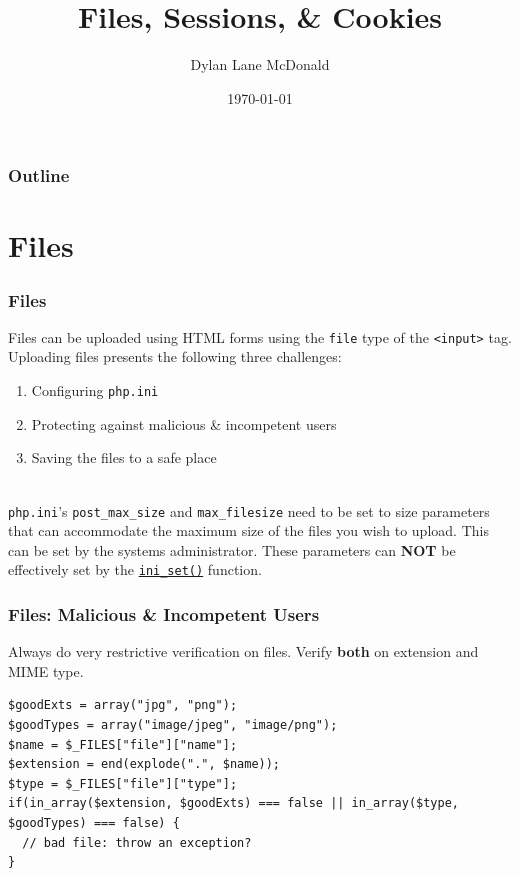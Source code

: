 \documentclass[aspectratio=169]{beamer}
\title{Files, Sessions, \& Cookies}
\author{Dylan Lane McDonald}
\institute{CNM STEMulus Center\\Web Development with PHP}
\date{\today}
\begin{document}
\lstset{language=PHP}
\begin{frame}
\titlepage
\end{frame}

\begin{frame}
\frametitle{Outline}
\tableofcontents
\end{frame}

\section{Files}
\begin{frame}
\frametitle{Files}
Files can be uploaded using HTML forms using the \texttt{file} type of the \texttt{<input>} tag. Uploading files presents the following three challenges:
\begin{enumerate}
	\item Configuring \texttt{php.ini}
	\item Protecting against malicious \& incompetent users
	\item Saving the files to a safe place
\end{enumerate}
\pause
\mbox{}\\
\texttt{php.ini}'s \texttt{post\_max\_size} and \texttt{max\_filesize} need to be set to size parameters that can accommodate the maximum size of the files you wish to upload. This can be set by the systems administrator. These parameters can \textbf{NOT} be effectively set by the \href{http://us.php.net/manual/en/function.ini-set.php}{\texttt{ini\_set()}} function.
\end{frame}

\begin{frame}[fragile]
\frametitle{Files: Malicious \& Incompetent Users}
Always do very restrictive verification on files. Verify \textbf{both} on extension and MIME type.
\begin{lstlisting}[caption=Verifying a File,label=code:file-verify]
$goodExts = array("jpg", "png");
$goodTypes = array("image/jpeg", "image/png");
$name = $_FILES["file"]["name"];
$extension = end(explode(".", $name));
$type = $_FILES["file"]["type"];
if(in_array($extension, $goodExts) === false || in_array($type, $goodTypes) === false) {
  // bad file: throw an exception?
}
\end{lstlisting}
\end{frame}
\end{document}
